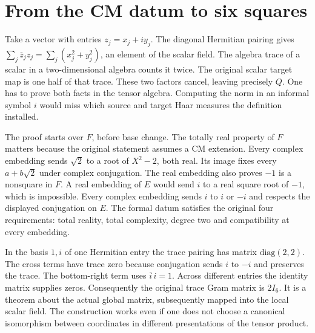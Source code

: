 \documentclass[12pt,letterpaper]{article}
\begin{document}
\section{From the CM datum to six squares}
Take a vector with entries $z_j=x_j+iy_j$. The diagonal Hermitian pairing gives $\sum_j\overline z_jz_j=\sum_j(x_j^2+y_j^2)$, an element of the scalar field. The algebra trace of a scalar in a two-dimensional algebra counts it twice. The original scalar target map is one half of that trace. These two factors cancel, leaving precisely $Q$. One has to prove both facts in the tensor algebra. Computing the norm in an informal symbol $i$ would miss which source and target Haar measures the definition installed.
\par
The proof starts over $F$, before base change. The totally real property of $F$ matters because the original statement assumes a CM extension. Every complex embedding sends $\sqrt2$ to a root of $X^2-2$, both real. Its image fixes every $a+b\sqrt2$ under complex conjugation. The real embedding also proves $-1$ is a nonsquare in $F$. A real embedding of $E$ would send $i$ to a real square root of $-1$, which is impossible. Every complex embedding sends $i$ to $i$ or $-i$ and respects the displayed conjugation on $E$. The formal datum satisfies the original four requirements: total reality, total complexity, degree two and compatibility at every embedding.
\par
In the basis $1,i$ of one Hermitian entry the trace pairing has matrix $\mathrm{diag}(2,2)$. The cross terms have trace zero because conjugation sends $i$ to $-i$ and preserves the trace. The bottom-right term uses $\overline i\,i=1$. Across different entries the identity matrix supplies zeros. Consequently the original trace Gram matrix is $2I_6$. It is a theorem about the actual global matrix, subsequently mapped into the local scalar field. The construction works even if one does not choose a canonical isomorphism between coordinates in different presentations of the tensor product.
\end{document}
